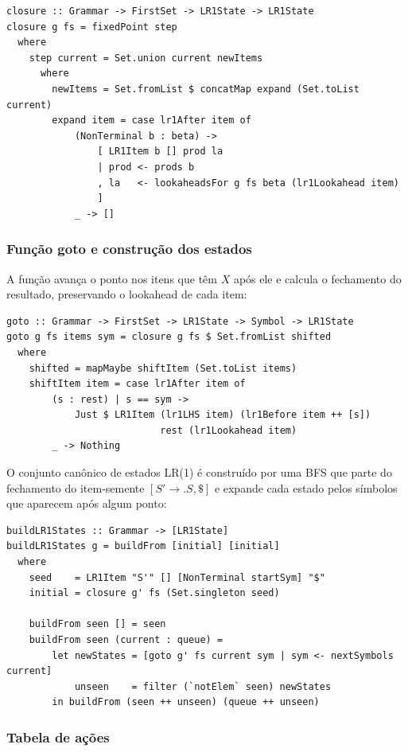 \begin{verbatim}
closure :: Grammar -> FirstSet -> LR1State -> LR1State
closure g fs = fixedPoint step
  where
    step current = Set.union current newItems
      where
        newItems = Set.fromList $ concatMap expand (Set.toList current)
        expand item = case lr1After item of
            (NonTerminal b : beta) ->
                [ LR1Item b [] prod la
                | prod <- prods b
                , la   <- lookaheadsFor g fs beta (lr1Lookahead item)
                ]
            _ -> []
\end{verbatim}

\subsubsection{Função goto e construção dos estados}

A função  avança o ponto
nos itens que têm \(X\) após ele e calcula o fechamento do resultado,
preservando o lookahead de cada item:

\begin{verbatim}
goto :: Grammar -> FirstSet -> LR1State -> Symbol -> LR1State
goto g fs items sym = closure g fs $ Set.fromList shifted
  where
    shifted = mapMaybe shiftItem (Set.toList items)
    shiftItem item = case lr1After item of
        (s : rest) | s == sym ->
            Just $ LR1Item (lr1LHS item) (lr1Before item ++ [s])
                           rest (lr1Lookahead item)
        _ -> Nothing
\end{verbatim}

O conjunto canônico de estados LR(1) é construído por uma BFS que
parte do fechamento do item-semente \([S' \to . S, \$]\) e expande
cada estado pelos símbolos que aparecem após algum ponto:

\begin{verbatim}
buildLR1States :: Grammar -> [LR1State]
buildLR1States g = buildFrom [initial] [initial]
  where
    seed    = LR1Item "S'" [] [NonTerminal startSym] "$"
    initial = closure g' fs (Set.singleton seed)

    buildFrom seen [] = seen
    buildFrom seen (current : queue) =
        let newStates = [goto g' fs current sym | sym <- nextSymbols current]
            unseen    = filter (`notElem` seen) newStates
        in buildFrom (seen ++ unseen) (queue ++ unseen)
\end{verbatim}

\subsubsection{Tabela de ações}


